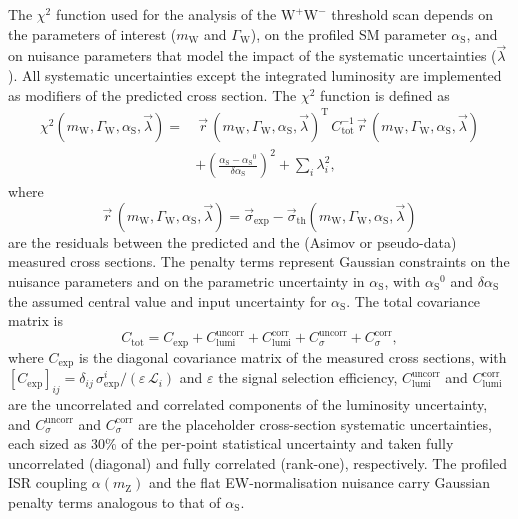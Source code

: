 \documentclass[a4paper,11pt]{article}
\newcommand{\WW}{\ensuremath{\mathrm{W^+W^-}}\xspace}
\newcommand{\mW}{\ensuremath{m_\mathrm{W}}\xspace}
\newcommand{\mZ}{\ensuremath{m_\mathrm{Z}}\xspace}
\newcommand{\GW}{\ensuremath{\Gamma_\mathrm{W}}\xspace}
\newcommand{\chisq}{\ensuremath{\chi^2}\xspace}
\newcommand{\as}{\ensuremath{\alpha_\mathrm{S}}\xspace}
\begin{document}
The \chisq function used for the analysis of the \WW threshold scan
depends on the parameters of interest (\mW and \GW), on the profiled SM
parameter \as, and on nuisance parameters that model the impact of the
systematic uncertainties ($\vec{\lambda}$). All systematic uncertainties
except the integrated luminosity are implemented as modifiers of the
predicted cross section. The \chisq function is defined as
\begin{align}
    \chisq(\mW,\GW,\as,\vec{\lambda}) =&~
    \vec{r}\,(\mW,\GW,\as,\vec{\lambda})^\mathrm{T}\,
    C_\mathrm{tot}^{-1}\,
    \vec{r}\,(\mW,\GW,\as,\vec{\lambda}) \nonumber \\
    &+ \left(\frac{\as-\as^0}{\delta\as}\right)^2 + \sum_i \lambda_i^2,
    \label{eq:chisq}
\end{align}
where
\begin{equation}
    \vec{r}\,(\mW,\GW,\as,\vec{\lambda}) =
    \vec{\sigma}_\mathrm{exp} -
    \vec{\sigma}_\mathrm{th}(\mW,\GW,\as,\vec{\lambda})
\end{equation}
are the residuals between the predicted and the (Asimov or pseudo-data)
measured cross sections. The penalty terms represent Gaussian
constraints on the nuisance parameters and on the parametric uncertainty
in \as, with $\as^0$ and $\delta\as$ the assumed central value and input
uncertainty for \as. The total covariance matrix is
\begin{equation}
    C_\mathrm{tot} = C_\mathrm{exp} + C_\mathrm{lumi}^\mathrm{uncorr} +
    C_\mathrm{lumi}^\mathrm{corr} + C_{\sigma}^\mathrm{uncorr} +
    C_{\sigma}^\mathrm{corr},
\end{equation}
where $C_\mathrm{exp}$ is the diagonal covariance matrix of the measured
cross sections, with
$[C_\mathrm{exp}]_{ij} =
\delta_{ij}\,\sigma_\mathrm{exp}^i/(\varepsilon\,\mathcal{L}_i)$ and
$\varepsilon$ the signal selection efficiency,
$C_\mathrm{lumi}^\mathrm{uncorr}$ and $C_\mathrm{lumi}^\mathrm{corr}$
are the uncorrelated and correlated components of the luminosity
uncertainty, and $C_{\sigma}^\mathrm{uncorr}$ and
$C_{\sigma}^\mathrm{corr}$ are the placeholder cross-section systematic
uncertainties, each sized as $30\%$ of the per-point statistical
uncertainty and taken fully uncorrelated (diagonal) and fully correlated
(rank-one), respectively. The profiled ISR coupling $\alpha(\mZ)$ and
the flat EW-normalisation nuisance carry Gaussian penalty terms
analogous to that of \as.
\end{document}
